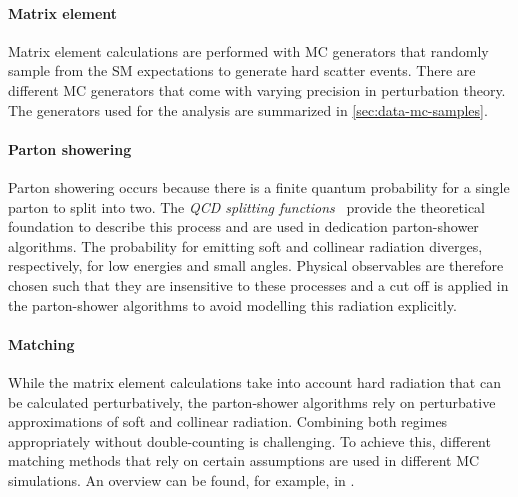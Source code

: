 
\paragraph{Matrix element}
Matrix element calculations are performed with MC generators that randomly sample from the SM expectations to generate hard scatter events. 
There are different MC generators that come with varying precision in perturbation theory. The generators used for the \HWW analysis are summarized in \cref{sec:data-mc-samples}.

\paragraph{Parton showering}
Parton showering occurs because there is a finite quantum probability for a single parton to split into two. 
The \emph{QCD splitting functions}~\cite{Altarelli:1977zs} provide the theoretical foundation to describe this process and are used in dedication parton-shower algorithms.
The probability for emitting soft and collinear radiation diverges, respectively, for low energies and small angles. 
Physical observables are therefore chosen such that they are insensitive to these processes and a cut off is applied in the parton-shower algorithms to avoid modelling this radiation explicitly.

\paragraph{Matching} 
While the matrix element calculations take into account hard radiation that can be calculated perturbatively, the parton-shower algorithms rely on perturbative approximations of soft and collinear radiation. 
Combining both regimes appropriately without double-counting is challenging.
To achieve this, different matching methods that rely on certain assumptions are used in different MC simulations. An overview can be found, for example, in .

